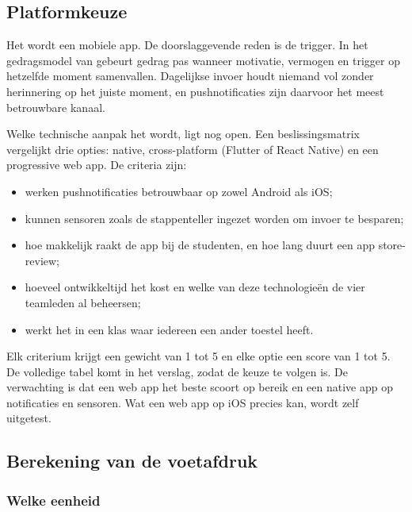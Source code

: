 \documentclass{hogent-article}
\begin{document}
    \subsection{Platformkeuze}%
    \label{ssec:platformkeuze}
    
    Het wordt een mobiele app. De doorslaggevende reden is de trigger. In het
    gedragsmodel van \textcite{Fogg2009} gebeurt gedrag pas wanneer motivatie,
    vermogen en trigger op hetzelfde moment samenvallen. Dagelijkse invoer houdt
    niemand vol zonder herinnering op het juiste moment, en pushnotificaties zijn
    daarvoor het meest betrouwbare kanaal.
    
    Welke technische aanpak het wordt, ligt nog open. Een beslissingsmatrix
    vergelijkt drie opties: native, cross-platform (Flutter of React Native) en een
    progressive web app. De criteria zijn:
    
    \begin{itemize}
        \item werken pushnotificaties betrouwbaar op zowel Android als iOS;
        \item kunnen sensoren zoals de stappenteller ingezet worden om invoer te
        besparen;
        \item hoe makkelijk raakt de app bij de studenten, en hoe lang duurt een app
        store-review;
        \item hoeveel ontwikkeltijd het kost en welke van deze technologieën de vier
        teamleden al beheersen;
        \item werkt het in een klas waar iedereen een ander toestel heeft.
    \end{itemize}
    
    Elk criterium krijgt een gewicht van 1 tot 5 en elke optie een score van 1 tot 5.
    De volledige tabel komt in het verslag, zodat de keuze te volgen is. De
    verwachting is dat een web app het beste scoort op bereik en een native app op
    notificaties en sensoren. Wat een web app op iOS precies kan, wordt zelf
    uitgetest.
    
    \subsection{Berekening van de voetafdruk}%
    \label{ssec:berekeningsmodel}
    
    \subsubsection{Welke eenheid}
    \label{sssec:welkeeenheid}
    
\end{document}
